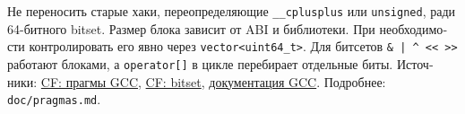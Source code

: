 \begin{otherlanguage}{russian}
Не переносить старые хаки, переопределяющие
\texttt{\_\_cplusplus} или \texttt{unsigned}, ради 64-битного
bitset. Размер блока зависит от ABI и библиотеки. При необходимости
контролировать его явно через \texttt{vector<uint64\_t>}.
Для битсетов \texttt{\& | \^{} << >>} работают блоками, а
\texttt{operator[]} в цикле перебирает отдельные биты.
{\scriptsize Источники:
\href{https://codeforces.com/blog/entry/129283}{CF: прагмы GCC},
\href{https://codeforces.com/blog/entry/77480}{CF: bitset},
\href{https://gcc.gnu.org/onlinedocs/gcc/Function-Specific-Option-Pragmas.html}{документация GCC}.
Подробнее: \texttt{doc/pragmas.md}.}

\end{otherlanguage}
\endgroup
